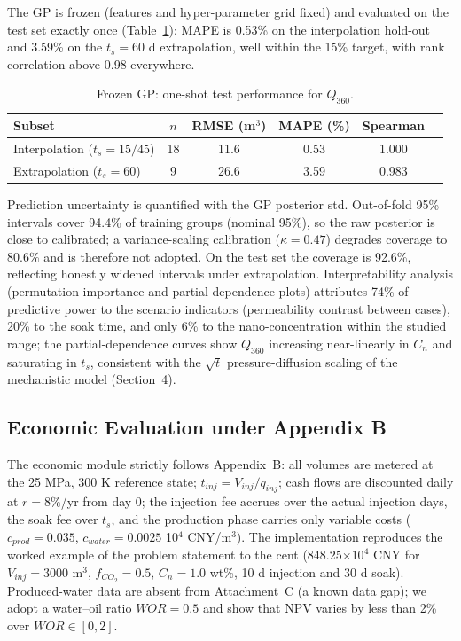 The GP is frozen (features and hyper-parameter grid fixed) and evaluated on
the test set exactly once (Table~\ref{tbl:p4_test}): MAPE is 0.53\% on the
interpolation hold-out and 3.59\% on the $t_s = 60$ d extrapolation, well
within the 15\% target, with rank correlation above 0.98 everywhere.

\begin{table}[h!t]
\centering
\caption{Frozen GP: one-shot test performance for $Q_{360}$.}
\label{tbl:p4_test}
\small
\begin{tabular}{lccccc}
\toprule[1.5pt]
Subset & $n$ & RMSE (m$^3$) & MAPE (\%) & Spearman\\
\midrule[1pt]
Interpolation ($t_s=15/45$) & 18 & 11.6 & 0.53 & 1.000\\
Extrapolation ($t_s=60$)    & 9  & 26.6 & 3.59 & 0.983\\
\bottomrule[1.5pt]
\end{tabular}
\end{table}

Prediction uncertainty is quantified with the GP posterior std. Out-of-fold
95\% intervals cover 94.4\% of training groups (nominal 95\%), so the raw
posterior is close to calibrated; a variance-scaling calibration
($\kappa = 0.47$) degrades coverage to 80.6\% and is therefore not adopted.
On the test set the coverage is 92.6\%, reflecting honestly widened
intervals under extrapolation. Interpretability analysis (permutation
importance and partial-dependence
plots) attributes 74\% of predictive power to the scenario indicators
(permeability contrast between cases), 20\% to the soak time, and only
6\% to the nano-concentration within the studied range; the partial-dependence
curves show $Q_{360}$ increasing near-linearly in $C_n$ and saturating in
$t_s$, consistent with the $\sqrt{t}$ pressure-diffusion scaling of the
mechanistic model (Section~4).

\subsection{Economic Evaluation under Appendix B}
The economic module strictly follows Appendix~B: all volumes are metered at
the 25 MPa, 300 K reference state; $t_{inj} = V_{inj}/q_{inj}$; cash flows
are discounted daily at $r = 8\%$/yr from day 0; the injection fee accrues
over the actual injection days, the soak fee over $t_s$, and the production
phase carries only variable costs ($c_{prod} = 0.035$, $c_{water} = 0.0025$
10$^4$ CNY/m$^3$). The implementation reproduces the worked example of the
problem statement to the cent (848.25$\times10^4$ CNY for
$V_{inj}=3000$ m$^3$, $f_{CO_2}=0.5$, $C_n=1.0$ wt\%, 10 d injection and
30 d soak). Produced-water data are absent from Attachment~C (a known data
gap); we adopt a water--oil ratio $WOR = 0.5$ and show that NPV varies by
less than 2\% over $WOR \in [0,2]$.

